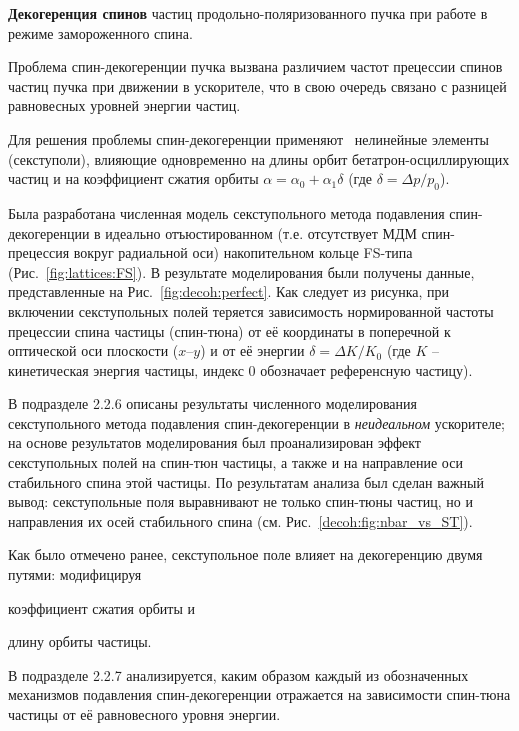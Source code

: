 \textbf{Декогеренция спинов} частиц продольно-поляризованного пучка 
при работе в режиме замороженного спина.

Проблема спин-декогеренции пучка вызвана различием частот прецессии спинов частиц пучка 
при движении в ускорителе, что в свою очередь связано с разницей равновесных уровней энергии частиц. 

Для решения проблемы спин-декогеренции применяют~\cite{COSY:SCT:IPAC15, COSY:SCT:1000sec} 
нелинейные элементы (секступоли), влияющие одновременно на длины орбит бетатрон-осциллирующих частиц  
и на коэффициент сжатия орбиты ${\alpha = \alpha_0 + \alpha_1\delta}$ (где ${\delta=\Delta p/p_0}$).

Была разработана численная модель секступольного метода подавления спин-декогеренции 
в идеально отъюстированном (т.е. отсутствует МДМ спин-прецессия вокруг радиальной оси) накопительном кольце 
FS-типа (Рис.~\ref{fig:lattices:FS}). В результате моделирования были получены данные, представленные на Рис.~\ref{fig:decoh:perfect}. Как следует из рисунка, при включении секступольных полей теряется зависимость
нормированной частоты прецессии спина частицы (спин-тюна) от её координаты в поперечной к оптической оси
 плоскости ($x$--$y$) и от её энергии $\delta = \Delta K/K_0$ 
 (где $K$ -- кинетическая энергия частицы, индекс 0 обозначает референсную частицу).
 
 В подразделе 2.2.6 описаны результаты численного моделирования секступольного метода 
 подавления спин-декогеренции в \emph{неидеальном} ускорителе; 
 на основе результатов моделирования был проанализирован
 эффект секступольных полей на спин-тюн частицы, а также и на направление оси стабильного спина этой частицы. 
 По результатам анализа был сделан важный вывод: секступольные поля выравнивают не только спин-тюны
 частиц, но и направления их осей стабильного спина (см. Рис.~\ref{decoh:fig:nbar_vs_ST}).
 
 Как было отмечено ранее, секступольное поле влияет на декогеренцию двумя путями: 
 модифицируя 
 \begin{enumerate*}[(1)] 
 	\item коэффициент сжатия орбиты и 
 	\item длину орбиты частицы.
 \end{enumerate*}
 В подразделе 2.2.7 анализируется, каким образом каждый из обозначенных механизмов 
 подавления спин-декогеренции отражается на зависимости спин-тюна частицы
 от её равновесного уровня энергии.

